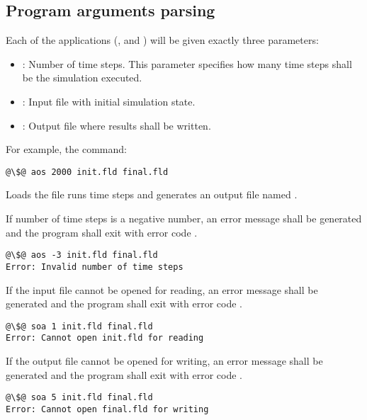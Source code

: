 \subsection{Program arguments parsing}

Each of the applications (, and
) will be given exactly three parameters:

\begin{itemize}
\item {}: Number of time steps. This parameter specifies how many
time steps shall be the simulation executed.
\item {}: Input file with initial simulation state.
\item {}: Output file where results shall be written.
\end{itemize}

For example, the command:

\begin{lstlisting}[style=terminal,escapechar=@]
@\$@ aos 2000 init.fld final.fld
\end{lstlisting}

Loads the file  runs  time steps and generates an
output file named .

If number of time steps is a negative number, an error message shall be
generated and the program shall exit with error code .

\begin{lstlisting}[style=terminal,escapechar=@]
@\$@ aos -3 init.fld final.fld
Error: Invalid number of time steps
\end{lstlisting}

If the input file cannot be opened for reading, an error message shall be
generated and the program shall exit with error code .

\begin{lstlisting}[style=terminal,escapechar=@]
@\$@ soa 1 init.fld final.fld
Error: Cannot open init.fld for reading
\end{lstlisting}

If the output file cannot be opened for writing, an error message shall be
generated and the program shall exit with error code .

\begin{lstlisting}[style=terminal,escapechar=@]
@\$@ soa 5 init.fld final.fld
Error: Cannot open final.fld for writing
\end{lstlisting}
